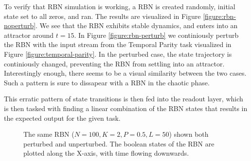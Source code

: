 To verify that RBN simulation is working,
a RBN is created randomly, initial state set to all zeros, and ran.
The results are visualized in Figure \ref{figure:rbn-noperturb}.
We see that the RBN exhibits stable dynamics, and enters into an attractor around $t=15$.
In Figure \ref{figure:rbn-perturb} we continiously perturb the RBN with the input stream from the Temporal Parity task visualized in Figure \ref{figure:temporal-parity}.
In the perturbed case, the state trajectory is continiously changed, preventing the RBN from settling into an attractor.
Interestingly enough, there seems to be a visual similarity between the two cases.
Such a pattern is sure to dissapear with a RBN in the chaotic phase.

This erratic pattern of state transitions is then fed into the readout layer,
which is then tasked with finding a linear combination of the RBN states that results in the expected output for the given task.

\begin{figure}
  \caption{
    The same RBN ($N=100, K=2, P=0.5, L=50$) shown both perturbed and unperturbed.
    The boolean states of the RBN are plotted along the X-axis,
    with time flowing downwards.
  }
\end{figure}


